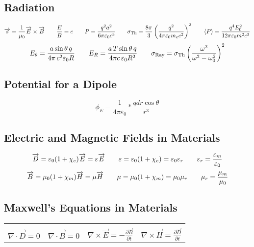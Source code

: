 \documentclass{article}
\begin{document}
\subsection*{Radiation}
\[\overrightarrow{s}=\frac{1}{\mu_0}\overrightarrow{E}\times\overrightarrow{B}\hspace{7 mm}\frac{E}{B}=c\hspace{7 mm}P=\frac{q^2a^2}{6\pi\varepsilon_0c^3}\hspace{7 mm}\sigma_{\textnormal{Th}}=\frac{8\pi}{3}\left(\frac{q^2}{4\pi\varepsilon_0m_ec^2}\right)^2\hspace{7 mm}\left<P\right>=\frac{q^4E_0^2}{12\pi\varepsilon_0m^2c^3}\]
\[E_\theta=\frac{a\sin\theta\,q}{4\pi\,c^2\varepsilon_0R}\hspace{7 mm}E_R=\frac{a\,T\sin\theta\,q}{4\pi c\,\varepsilon_0R^2}\hspace{7 mm}\sigma_\textnormal{Ray}=\sigma_\textnormal{Th}\left(\frac{\omega^2}{\omega^2-\omega_0^2}\right)^2\]
\subsection*{Potential for a Dipole}
\[\phi_E=\frac{1}{4\pi\varepsilon_0}*\frac{qdr\cos\theta}{r^3}\]
\subsection*{Electric and Magnetic Fields in Materials}
\[\overrightarrow{D}=\varepsilon_0(1+\chi_e)\overrightarrow{E}=\varepsilon\overrightarrow{E}\hspace{7 mm}\varepsilon=\varepsilon_0(1+\chi_e)=\varepsilon_0\varepsilon_r\hspace{7 mm}\varepsilon_r=\frac{\varepsilon_m}{\varepsilon_0}\]
\[\overrightarrow{B}=\mu_0(1+\chi_m)\overrightarrow{H}=\mu\overrightarrow{H}\hspace{7 mm}\mu=\mu_0(1+\chi_m)=\mu_0\mu_r\hspace{7 mm}\mu_r=\frac{\mu_m}{\mu_0}\]
\subsection*{Maxwell's Equations in Materials}
\begin{center}
\begin{tabular}{|| c c c c ||}
\hline
&&&\\
\(\nabla\cdot\overrightarrow{D}=0\) & \(\nabla\cdot\overrightarrow{B}=0\) & \(\nabla\times\overrightarrow{E}=-\frac{\partial\overrightarrow{B}}{\partial t}\) & \(\nabla\times\overrightarrow{H}=\frac{\partial\overrightarrow{D}}{\partial t}\)\\[10pt]
\hline
\end{tabular}
\end{center}
\end{document}
